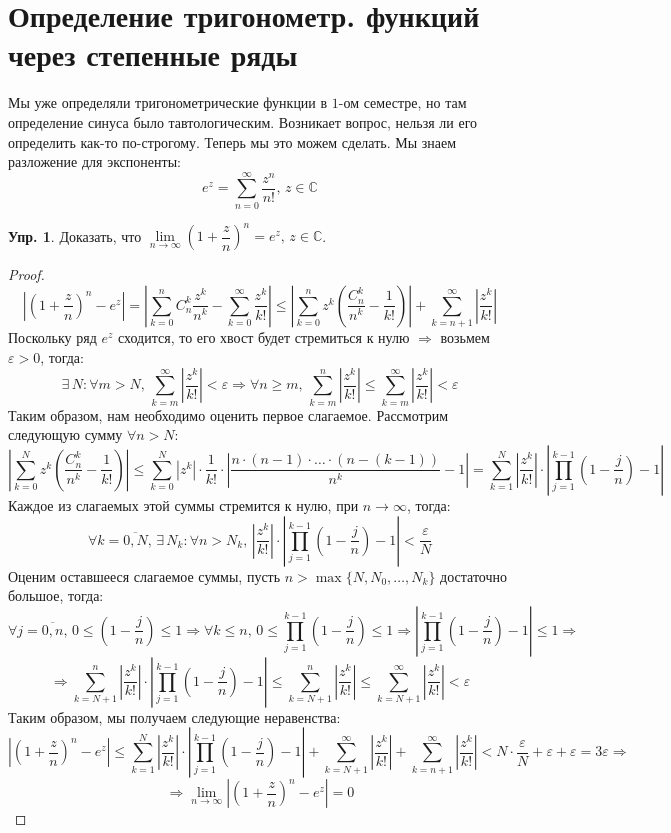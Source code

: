 \documentclass[12pt]{article}
\newcommand{\MC}{\mathbb{C}}
\newcommand{\VE}{\varepsilon}
\theoremstyle{definition}
\newtheorem{exrc}{Упр.}
\newcommand{\ddsum}[2]{\displaystyle\sum\limits_{#1}^{#2}}
\begin{document}
\section*{Определение тригонометр. функций через степенные ряды}
Мы уже определяли тригонометрические функции в $1$-ом семестре, но там определение синуса было тавтологическим. Возникает вопрос, нельзя ли его определить как-то по-строгому. Теперь мы это можем сделать. Мы знаем разложение для  экспоненты:
$$
	e^z = \ddsum{n = 0}{\infty}\dfrac{z^n}{n!}, \, z \in \MC
$$
\begin{exrc}
	Доказать, что $\lim\limits_{n \to \infty}\left(1 + \dfrac{z}{n}\right)^n = e^z, \, z \in \MC$.
\end{exrc}
\begin{proof}
	$$
		\left| \left(1 + \dfrac{z}{n}\right)^n - e^z \right| = \left|\ddsum{k =0}{n}C_n^k \dfrac{z^k}{n^k} - \ddsum{k = 0}{\infty}\dfrac{z^k}{k!}\right| \leq \left|\ddsum{k = 0}{n}z^k\left(\dfrac{C_n^k}{n^k} - \dfrac{1}{k!}\right)\right| + \ddsum{k = n + 1}{\infty}\left|\dfrac{z^k}{k!}\right|
	$$
	Поскольку ряд $e^z$ сходится, то его хвост будет стремиться к нулю $\Rightarrow$ возьмем $\VE > 0$, тогда:
	$$
		\exists \, N \colon \forall m > N, \, \ddsum{k = m }{\infty}\left|\dfrac{z^k}{k!}\right| < \VE \Rightarrow \forall n \geq m, \, \ddsum{k = m }{n}\left|\dfrac{z^k}{k!}\right| \leq \ddsum{k = m }{\infty}\left|\dfrac{z^k}{k!}\right|< \VE
	$$
	Таким образом, нам необходимо оценить первое слагаемое. Рассмотрим следующую сумму $\forall n > N$:
	$$
		\left|\ddsum{k = 0}{N}z^k\left(\dfrac{C_n^k}{n^k} - \dfrac{1}{k!}\right)\right| \leq \ddsum{k = 0}{N}|z^k|{\cdot}\dfrac{1}{k!}{\cdot}\left|\dfrac{n{\cdot}(n-1){\cdot}\dotsc{\cdot}(n - (k-1))}{n^k} - 1\right| = \ddsum{k = 1}{N}\left|\dfrac{z^k}{k!}\right|{\cdot}\left|\prod\limits_{j = 1}^{k-1}\left(1-\dfrac{j}{n}\right) -1 \right|
	$$
	Каждое из слагаемых этой суммы стремится к нулю, при $n \to \infty$, тогда:
	$$
		\forall k = \overline{0,N}, \, \exists \, N_k \colon \forall n > N_k, \, \left|\dfrac{z^k}{k!}\right|{\cdot}\left|\prod\limits_{j = 1}^{k-1}\left(1-\dfrac{j}{n}\right) -1 \right| < \dfrac{\VE}{N}
	$$
	Оценим оставшееся слагаемое суммы, пусть $n > \max\{N, N_0, \dotsc, N_k\}$ достаточно большое, тогда:
	$$
		\forall j = \overline{0,n}, \, 0 \leq \left(1-\dfrac{j}{n}\right) \leq 1 \Rightarrow \forall k \leq n, \, 0 \leq \prod\limits_{j = 1}^{k-1}\left(1-\dfrac{j}{n}\right) \leq 1 \Rightarrow \left|\prod\limits_{j = 1}^{k-1}\left(1-\dfrac{j}{n}\right) -1 \right| \leq 1 \Rightarrow
	$$
	$$	
		\Rightarrow \ddsum{k = N+1}{n}\left|\dfrac{z^k}{k!}\right|{\cdot}\left|\prod\limits_{j = 1}^{k-1}\left(1-\dfrac{j}{n}\right) -1 \right| \leq \ddsum{k = N+1}{n}\left|\dfrac{z^k}{k!}\right| \leq \ddsum{k = N+1}{\infty}\left|\dfrac{z^k}{k!}\right| < \VE
	$$
	Таким образом, мы получаем следующие неравенства:
	$$
		\left| \left(1 + \dfrac{z}{n}\right)^n - e^z \right| \leq \ddsum{k = 1}{N}\left|\dfrac{z^k}{k!}\right|{\cdot}\left|\prod\limits_{j = 1}^{k-1}\left(1-\dfrac{j}{n}\right) -1 \right| + \ddsum{k = N+1}{\infty}\left|\dfrac{z^k}{k!}\right| + \ddsum{k = n + 1}{\infty}\left|\dfrac{z^k}{k!}\right| < N{\cdot}\dfrac{\VE}{N} + \VE + \VE = 3 \VE \Rightarrow
	$$
	$$
		\Rightarrow  \lim\limits_{n\to \infty}\left| \left(1 + \dfrac{z}{n}\right)^n - e^z \right| = 0
	$$
\end{proof}
\end{document}
